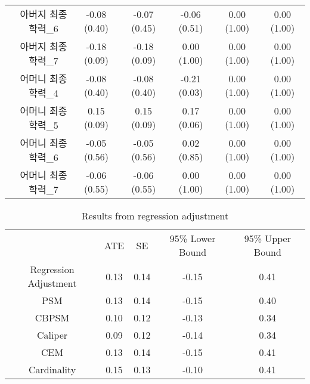 \begin{table}[ph]
{\begin{tabular}{cc|ccccc}
                                                                                               & 아버지 최종학력\_6  & -0.08 (0.40) & -0.07 (0.45) & -0.06 (0.51) & 0.00 (1.00)  & 0.00 (1.00)     \\
                                                                                               & 아버지 최종학력\_7  & -0.18 (0.09) & -0.18 (0.09) & 0.00 (1.00)  & 0.00 (1.00)  & 0.00 (1.00)     \\
                                                                                               & 어머니 최종학력\_4  & -0.08 (0.40) & -0.08 (0.40) & -0.21 (0.03) & 0.00 (1.00)  & 0.00 (1.00)     \\
                                                                                               & 어머니 최종학력\_5  & 0.15 (0.09)  & 0.15 (0.09)  & 0.17 (0.06)  & 0.00 (1.00)  & 0.00 (1.00)     \\
                                                                                               & 어머니 최종학력\_6  & -0.05 (0.56)  & -0.05 (0.56)  & 0.02 (0.85)   & 0.00 (1.00)  & 0.00 (1.00)     \\
                                                                                               & 어머니 최종학력\_7  & -0.06 (0.55) & -0.06 (0.55) & 0.00 (1.00)  & 0.00 (1.00)  & 0.00 (1.00)     \\ \hline
\end{tabular}}
\end{table}

\begin{table}[t]
\caption{Results from regression adjustment} \label{tbRA3}
\footnotesize
   \centering
{\tabcolsep=16.5pt
\begin{tabular}{c||c|c|c|c}
\hline
     & ATE    & SE    & 95\% Lower Bound & 95\% Upper Bound \\ \hhline{=#=|=|=|=}
Regression Adjustment  & 0.13 & 0.14 & -0.15 & 0.41 \\ \hline
PSM  & 0.13 & 0.14 & -0.15 & 0.40 \\ \hline
CBPSM  & 0.10 & 0.12 & -0.13 & 0.34 \\ \hline
Caliper  & 0.09 & 0.12 & -0.14 & 0.34 \\ \hline
CEM  & 0.13 & 0.14 & -0.15 & 0.41 \\ \hline
Cardinality  & 0.15 & 0.13 & -0.10 & 0.41 \\ \hline
\end{tabular}}
\end{table}

